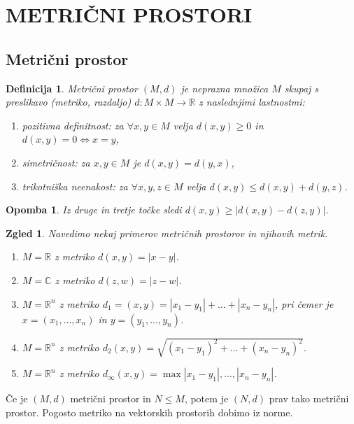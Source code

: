 \documentclass[10pt, a4paper]{article}
\newtheorem{defi}{Definicija}[section]
\newenvironment{noticeB}{%
  \tcolorbox[%
  notitle,
  empty,
  enhanced,  %
  breakable,
  coltext=black,
  colback=white, 
  fontupper=\rmfamily,
  parbox=false,
  noparskip,
  sharp corners,
  boxrule=-1pt,  %
  frame hidden,
  left=7pt,  %
  right=7pt,
  top=5pt,
  bottom=5pt,
  before skip=2.5ex plus 2pt,
  after skip=2.5ex plus 2pt,
  borderline west = {1.5pt}{-0.1pt}{blue!30!black}, %
  overlay unbroken and last={%
    \draw[color=black, line width=1.25pt]
    ($(frame.south west)+(1.pt, -0.1pt)$) -- ++(2em, 0);
  }
  ]}
{\endtcolorbox}
\newenvironment{definicija}{\begin{defi}\begin{noticeB}}{%
    \end{noticeB}\end{defi}}
\newtheorem*{opomba}{Opomba}
\newtheorem{zgled}{Zgled}[section]
\newcommand{\R}{\mathbb {R}}
\newcommand{\C}{\mathbb {C}}
\begin{document}
\section{METRIČNI PROSTORI}

\subsection{Metrični prostor}

\begin{definicija}
    Metrični prostor $(M, d)$ je neprazna množica $M$ skupaj s preslikavo (metriko, razdaljo) $d: M \times M \rightarrow \R$
    z naslednjimi lastnostmi:
    \begin{enumerate}
        \item pozitivna definitnost: za $\forall x, y \in M$ velja $d(x,y) \geq 0$ in $d(x,y) = 0 \iff x = y$,
        \item simetričnost: za $x,y \in M$ je $d(x,y) = d(y,x)$,
        \item trikotniška neenakost: za $\forall x,y,z \in M$ velja $d(x,y) \leq d(x,y) + d(y,z)$.
    \end{enumerate}
\end{definicija}

\begin{opomba}
    Iz druge in tretje točke sledi $d(x,y) \geq |d(x,y) - d(z,y)|$.
\end{opomba}

\begin{zgled}
    Navedimo nekaj primerov metričnih prostorov in njihovih metrik.
    \begin{enumerate}
        \item $M = \R$ z metriko $d(x,y) = |x-y|$.
        \item $M = \C$ z metriko $d(z,w) = |z-w|$.
        \item $M = \R^n$ z metriko $d_1 = (x,y) = |x_1 - y_1| + \dots + |x_n - y_n|$, pri čemer je $x = (x_1, \dots, x_n)$ in $y = (y_1, \dots, y_n)$.
        \item $M = \R^n$ z metriko $d_2(x,y) = \sqrt{(x_1 - y_1)^2 + \dots + (x_n - y_n)^2}$.
        \item $M = \R^n$ z metriko $d_\infty (x,y) = \max {|x_1 - y_1|, \dots, |x_n - y_n|}$.
    \end{enumerate}
\end{zgled}

Če je $(M, d)$ metrični prostor in $N \leq M$, potem je $(N, d)$ prav tako metrični prostor.
Pogosto metriko na vektorskih prostorih dobimo iz norme.
\end{document}
